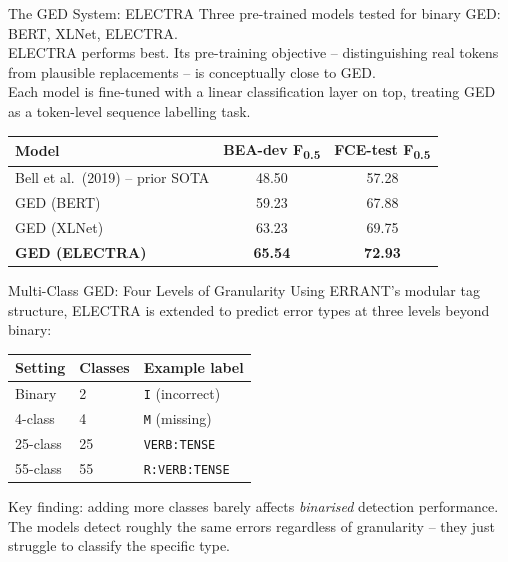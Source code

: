\documentclass[aspectratio=169]{beamer}
\newcommand{\fhalf}{F\textsubscript{0.5}}
\newcommand{\errtag}[1]{\texttt{#1}}
\begin{document}
\begin{frame}{The GED System: ELECTRA}
  Three pre-trained models tested for binary GED: BERT, XLNet, ELECTRA.\\[1em]

  ELECTRA performs best. Its pre-training objective -- distinguishing real
  tokens from plausible replacements -- is conceptually close to GED.\\[1em]

  Each model is fine-tuned with a linear classification layer on top,
  treating GED as a token-level sequence labelling task.

  \vspace{1em}
  \begin{center}
  \begin{tabular}{lcc}
    \toprule
    \textbf{Model} & \textbf{BEA-dev \fhalf} & \textbf{FCE-test \fhalf} \\
    \midrule
    Bell et al.\ (2019) -- prior SOTA & 48.50 & 57.28 \\
    GED (BERT) & 59.23 & 67.88 \\
    GED (XLNet) & 63.23 & 69.75 \\
    \textbf{GED (ELECTRA)} & \textbf{65.54} & \textbf{72.93} \\
    \bottomrule
  \end{tabular}
  \end{center}
\end{frame}

\begin{frame}{Multi-Class GED: Four Levels of Granularity}
  Using ERRANT's modular tag structure, ELECTRA is extended to predict
  error types at three levels beyond binary:

  \vspace{1em}
  \begin{center}
  \begin{tabular}{lll}
    \toprule
    \textbf{Setting} & \textbf{Classes} & \textbf{Example label} \\
    \midrule
    Binary   & 2  & \errtag{I} (incorrect) \\
    4-class  & 4  & \errtag{M} (missing) \\
    25-class & 25 & \errtag{VERB:TENSE} \\
    55-class & 55 & \errtag{R:VERB:TENSE} \\
    \bottomrule
  \end{tabular}
  \end{center}

  \vspace{1em}
  Key finding: adding more classes barely affects \textit{binarised} detection
  performance. The models detect roughly the same errors regardless of
  granularity -- they just struggle to classify the specific type.
\end{frame}
\end{document}
